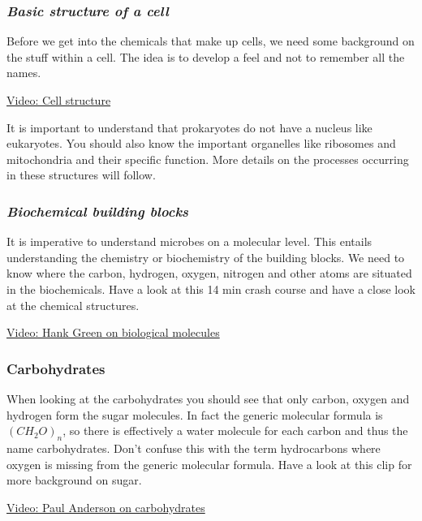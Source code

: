 \documentclass[11pt]{article}
\begin{document}
    \subsubsection{\texorpdfstring{\emph{Basic structure of a
cell}}{Basic structure of a cell}}\label{basic-structure-of-a-cell}

Before we get into the chemicals that make up cells, we need some
background on the stuff within a cell. The idea is to develop a feel and
not to remember all the names.

\href{https://www.youtube.com/watch?v=URUJD5NEXC8}{Video: Cell
structure}

It is important to understand that prokaryotes do not have a nucleus
like eukaryotes. You should also know the important organelles like
ribosomes and mitochondria and their specific function. More details on
the processes occurring in these structures will follow.

\subsubsection{\texorpdfstring{\emph{Biochemical building
blocks}}{Biochemical building blocks}}\label{biochemical-building-blocks}

It is imperative to understand microbes on a molecular level. This
entails understanding the chemistry or biochemistry of the building
blocks. We need to know where the carbon, hydrogen, oxygen, nitrogen and
other atoms are situated in the biochemicals. Have a look at this 14 min
crash course and have a close look at the chemical structures.

\href{https://www.youtube.com/watch?v=H8WJ2KENlK0}{Video: Hank Green on
biological molecules}

\subsubsection{Carbohydrates}\label{carbohydrates}

When looking at the carbohydrates you should see that only carbon,
oxygen and hydrogen form the sugar molecules. In fact the generic
molecular formula is \((CH_2O)_n\), so there is effectively a water
molecule for each carbon and thus the name carbohydrates. Don't confuse
this with the term hydrocarbons where oxygen is missing from the generic
molecular formula. Have a look at this clip for more background on
sugar.

\href{https://www.youtube.com/watch?v=_zm_DyD6FJ0}{Video: Paul Anderson
on carbohydrates}
\end{document}
